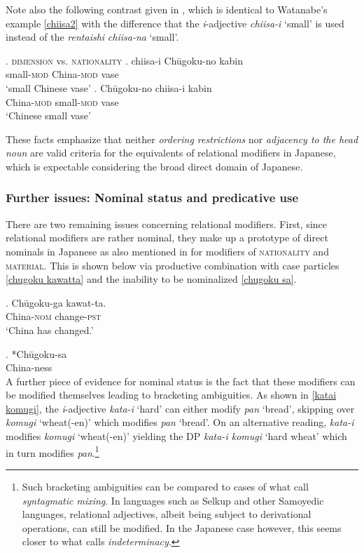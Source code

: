 \documentclass [output=book,colorlinks,citecolor=brown]{langscibook}
\begin{document}
Note also the following contrast given in \citet{nagano:2016:are}, which is identical to Watanabe’s example \ref{chiisa2} with the difference that the \textit{i}-adjective \textit{chiisa-i} `small’ is used instead of the \textit{rentaishi} \textit{chiisa-na} `small’.

\newpage

\ex. \textsc{dimension} vs. \textsc{nationality}
\ag. chiisa-i Chūgoku-no kabin\\
small-\textsc{mod} China-\textsc{mod} vase\\
`small Chinese vase'
\bg. Chūgoku-no chiisa-i kabin\\
China-\textsc{mod} small-\textsc{mod} vase\\
`Chinese small vase' \null \hfill \citep[57]{nagano:2016:are}

These facts emphasize that neither \textit{ordering restrictions} nor \textit{adjacency to the head noun} are valid criteria for the equivalents of relational modifiers in Japanese, which is expectable considering the broad direct domain of Japanese.

\subsubsection{Further issues: Nominal status and predicative use} \label{Ra japanese predicative}

There are two remaining issues concerning relational modifiers. First, since relational modifiers are rather nominal, they make up a prototype of direct nominals in Japanese as also mentioned in \citet{watanabe:2012:direct} for modifiers of \textsc{nationality} and \textsc{material}. This is shown below via productive combination with case particles \ref{chugoku kawatta} and the inability to be nominalized \ref{chugoku sa}. %

\exg. Chūgoku-ga kawat-ta.\\
China-\textsc{nom} change-\textsc{pst}\\
`China has changed.’ \label{chugoku kawatta}

\exg. *Chūgoku-sa\\
China-ness \label{chugoku sa}\\

A further piece of evidence for nominal status is the fact that these modifiers can be modified themselves leading to bracketing ambiguities. As shown in \ref{katai komugi}, the \textit{i}-adjective \textit{kata-i} `hard’ can either modify \textit{pan} `bread’, skipping over \textit{komugi} `wheat(-en)’ which modifies \textit{pan} `bread’. On an alternative reading, \textit{kata-i} modifies \textit{komugi} `wheat(-en)’ yielding the DP \textit{kata-i komugi} `hard wheat’ which in turn modifies \textit{pan}.\footnote{Such bracketing ambiguities can be compared to cases of what \citet{nikolaeva:2020:mixed} call \textit{syntagmatic mixing}. In languages such as Selkup and other Samoyedic languages, relational adjectives, albeit being subject to derivational operations, can still be modified. In the Japanese case however, this seems closer to what \citet{spencer:2005:towards} calls \textit{indeterminacy}.} %
\end{document}
